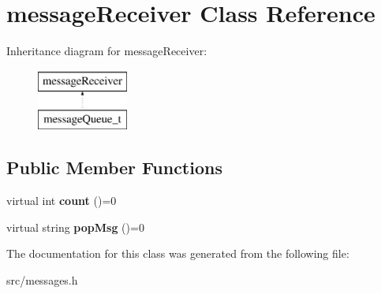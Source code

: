\hypertarget{classmessageReceiver}{\section{message\-Receiver \-Class \-Reference}
\label{classmessageReceiver}
}
\-Inheritance diagram for message\-Receiver\-:\begin{figure}[H]
\begin{center}
\leavevmode
\includegraphics[height=2.000000cm]{classmessageReceiver}
\end{center}
\end{figure}
\subsection*{\-Public \-Member \-Functions}
\begin{DoxyCompactItemize}
\item 
\hypertarget{classmessageReceiver_abee3c31f6432ce2d35004a68b3cf2488}{virtual int {\bfseries count} ()=0}\label{classmessageReceiver_abee3c31f6432ce2d35004a68b3cf2488}

\item 
\hypertarget{classmessageReceiver_a174f90a3752a93196b414c5494b94971}{virtual string {\bfseries pop\-Msg} ()=0}\label{classmessageReceiver_a174f90a3752a93196b414c5494b94971}

\end{DoxyCompactItemize}


\-The documentation for this class was generated from the following file\-:\begin{DoxyCompactItemize}
\item 
src/messages.\-h\end{DoxyCompactItemize}
